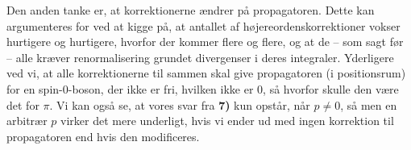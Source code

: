 \documentclass[../main.tex]{subfiles}
\begin{document}
Den anden tanke er, at korrektionerne ændrer på propagatoren. Dette kan argumenteres for ved at kigge på, at antallet af højereordenskorrektioner vokser hurtigere og hurtigere, hvorfor der kommer flere og flere, og at de -- som sagt før -- alle kræver renormalisering grundet divergenser i deres integraler. Yderligere ved vi, at alle korrektionerne til sammen skal give propagatoren (i positionsrum) for en spin-$0$-boson, der ikke er fri, hvilken ikke er $0$, så hvorfor skulle den være det for $\pi$. Vi kan også se, at vores svar fra \textbf{7)} kun opstår, når $p \ne 0$, så men en arbitrær $p$ virker det mere underligt, hvis vi ender ud med ingen korrektion til propagatoren end hvis den modificeres.


\end{document}
